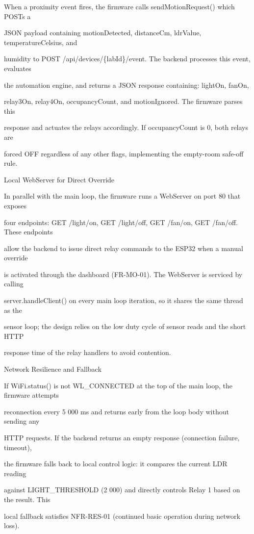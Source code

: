 When a proximity event fires, the firmware calls sendMotionRequest() which POSTs a

JSON payload containing motionDetected, distanceCm, ldrValue, temperatureCelsius, and

humidity to POST /api/devices/\{labId\}/event. The backend processes this event, evaluates

the automation engine, and returns a JSON response containing: lightOn, fanOn,

relay3On, relay4On, occupancyCount, and motionIgnored. The firmware parses this

response and actuates the relays accordingly. If occupancyCount is 0, both relays are

forced OFF regardless of any other flags, implementing the empty-room safe-off rule.

Local WebServer for Direct Override

In parallel with the main loop, the firmware runs a WebServer on port 80 that exposes

four endpoints: GET /light/on, GET /light/off, GET /fan/on, GET /fan/off. These endpoints

allow the backend to issue direct relay commands to the ESP32 when a manual override

is activated through the dashboard (FR-MO-01). The WebServer is serviced by calling

server.handleClient() on every main loop iteration, so it shares the same thread as the

sensor loop; the design relies on the low duty cycle of sensor reads and the short HTTP

response time of the relay handlers to avoid contention.

Network Resilience and Fallback

If WiFi.status() is not WL\_CONNECTED at the top of the main loop, the firmware attempts

reconnection every 5 000 ms and returns early from the loop body without sending any

HTTP requests. If the backend returns an empty response (connection failure, timeout),

the firmware falls back to local control logic: it compares the current LDR reading

against LIGHT\_THRESHOLD (2 000) and directly controls Relay 1 based on the result. This

local fallback satisfies NFR-RES-01 (continued basic operation during network loss).


